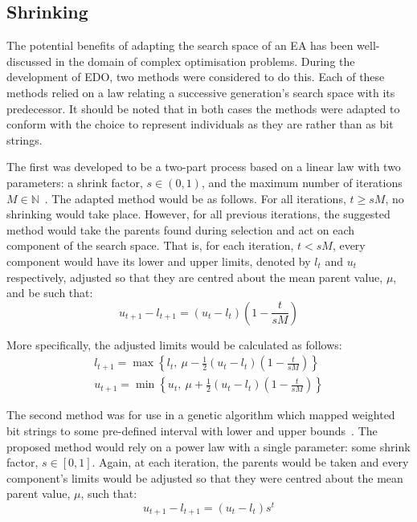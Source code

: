 

\subsection{Shrinking}

The potential benefits of adapting the search space of an EA has been
well-discussed in the domain of complex optimisation problems. During the
development of EDO, two methods were considered to do this. Each of these
methods relied on a law relating a successive generation's search space with its
predecessor. It should be noted that in both cases the methods were adapted to
conform with the choice to represent individuals as they are rather than as bit
strings.

The first was developed to be a two-part process based on a linear law with two
parameters: a shrink factor, \(s \in (0, 1)\), and the maximum number of
iterations \(M \in \mathbb{N}\)~\cite{Amirjanov2017}. The adapted method would
be as follows. For all iterations, \(t \geq sM\), no shrinking would take place.
However, for all previous iterations, the suggested method would take the
parents found during selection and act on each component of the search space.
That is, for each iteration, \(t < sM\), every component would have its lower
and upper limits, denoted by \(l_t\) and \(u_t\) respectively, adjusted so that
they are centred about the mean parent value, \(\mu\), and be such that:
\[
    u_{t+1} - l_{t+1} = (u_t - l_t) \left(1 - \frac{t}{sM}\right)
\]

More specifically, the adjusted limits would be calculated as follows:
\begin{align*}
    l_{t+1} = \max \left\{%
        l_t, \ \mu - \frac{1}{2} (u_t - l_t) \left(1 - \frac{t}{sM}\right)
    \right\}\\
    u_{t+1} = \min \left\{%
        u_t, \ \mu + \frac{1}{2} (u_t - l_t) \left(1 - \frac{t}{sM}\right)
    \right\}
\end{align*}

The second method was for use in a genetic algorithm which mapped weighted bit
strings to some pre-defined interval with lower and upper
bounds~\cite{Amirjanov2016}. The proposed method would rely on a power law with
a single parameter: some shrink factor, \(s \in [0, 1]\). Again, at each
iteration, the parents would be taken and every component's limits would be
adjusted so that they were centred about the mean parent value, \(\mu\), such
that:
\[
    u_{t+1} - l_{t+1} = (u_t - l_t) s^t
\]


